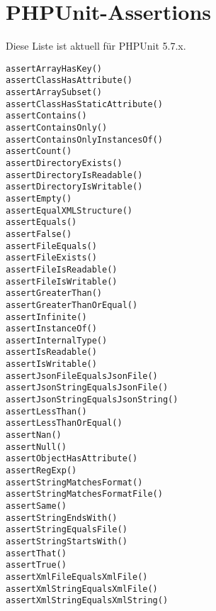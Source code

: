 \documentclass[a4paper,11pt,headsepline]{scrartcl}
\begin{document}
\pagebreak
\section{PHPUnit-Assertions}
Diese Liste ist aktuell für PHPUnit 5.7.x.

\begin{verbatim}
assertArrayHasKey()
assertClassHasAttribute()
assertArraySubset()
assertClassHasStaticAttribute()
assertContains()
assertContainsOnly()
assertContainsOnlyInstancesOf()
assertCount()
assertDirectoryExists()
assertDirectoryIsReadable()
assertDirectoryIsWritable()
assertEmpty()
assertEqualXMLStructure()
assertEquals()
assertFalse()
assertFileEquals()
assertFileExists()
assertFileIsReadable()
assertFileIsWritable()
assertGreaterThan()
assertGreaterThanOrEqual()
assertInfinite()
assertInstanceOf()
assertInternalType()
assertIsReadable()
assertIsWritable()
assertJsonFileEqualsJsonFile()
assertJsonStringEqualsJsonFile()
assertJsonStringEqualsJsonString()
assertLessThan()
assertLessThanOrEqual()
assertNan()
assertNull()
assertObjectHasAttribute()
assertRegExp()
assertStringMatchesFormat()
assertStringMatchesFormatFile()
assertSame()
assertStringEndsWith()
assertStringEqualsFile()
assertStringStartsWith()
assertThat()
assertTrue()
assertXmlFileEqualsXmlFile()
assertXmlStringEqualsXmlFile()
assertXmlStringEqualsXmlString()
\end{verbatim}
\end{document}
